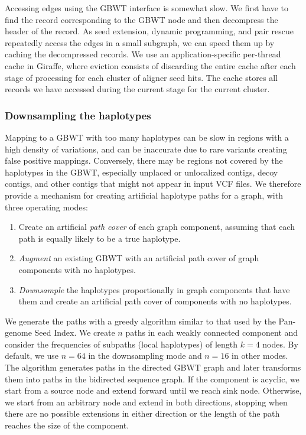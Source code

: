 \documentclass[11pt]{ucscthesis}
\newcommand{\vocab}[1]{\emph{#1}}
\begin{document}
Accessing edges using the GBWT interface is somewhat slow.
We first have to find the record corresponding to the GBWT node and then decompress the header of the record.
As seed extension, dynamic programming, and pair rescue repeatedly access the edges in a small subgraph, we can speed them up by caching the decompressed records.
We use an application-specific per-thread cache in Giraffe, where eviction consists of discarding the entire cache after each stage of processing for each cluster of aligner seed hits. The cache stores all records we have accessed during the current stage for the current cluster.


\subsubsection{Downsampling the haplotypes}
\label{subsec:downsampling}

Mapping to a GBWT with too many haplotypes can be slow in regions with a high density of variations, and can be inaccurate due to rare variants creating false positive mappings.
Conversely, there may be regions not covered by the haplotypes in the GBWT, especially unplaced or unlocalized contigs, decoy contigs, and other contigs that might not appear in input VCF files.
We therefore provide a mechanism for creating artificial haplotype paths for a graph, with three operating modes:
\begin{enumerate}
    \item Create an artificial \vocab{path cover} of each graph component, assuming that each path is equally likely to be a true haplotype.
    \item \vocab{Augment} an existing GBWT with an artificial path cover of graph components with no haplotypes.
    \item \vocab{Downsample} the haplotypes proportionally in graph components that have them and create an artificial path cover of components with no haplotypes.
\end{enumerate}

We generate the paths with a greedy algorithm similar to that used by the Pan-genome Seed Index\cite{Ghaffaari2019}.
We create $n$ paths in each weakly connected component and consider the frequencies of subpaths (local haplotypes) of length $k = 4$ nodes.
By default, we use $n = 64$ in the downsampling mode and $n = 16$ in other modes.
The algorithm generates paths in the directed GBWT graph and later transforms them into paths in the bidirected sequence graph.
If the component is acyclic, we start from a source node and extend forward until we reach sink node.
Otherwise, we start from an arbitrary node and extend in both directions, stopping when there are no possible extensions in either direction or the length of the path reaches the size of the component.
\end{document}
